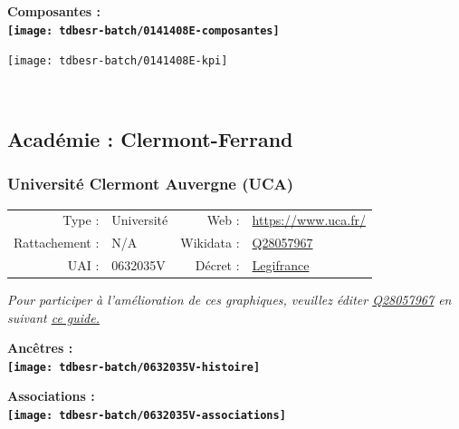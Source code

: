 \documentclass[12pt,french,]{article}
\begin{document}
\hrulefill

\begin{center} \bf Composantes : \\  
\texttt{[image: tdbesr-batch/0141408E-composantes]} \end{center}

\begin{center}\texttt{[image: tdbesr-batch/0141408E-kpi]} \end{center}\checkoddpage

\ifoddpage ~\newpage \fi   

\hypertarget{acaduxe9mie-clermont-ferrand}{%
\subsection{Académie :
Clermont-Ferrand}\label{acaduxe9mie-clermont-ferrand}}

\hypertarget{universituxe9-clermont-auvergne-uca}{%
\subsubsection{Université Clermont Auvergne
(UCA)}\label{universituxe9-clermont-auvergne-uca}}

\begin{tabular*}{\textwidth}{rp{5cm}rl}  
\hline  
Type : & Université & Web : &\href{https://www.uca.fr/}{https://www.uca.fr/} \\  
Rattachement : & N/A & Wikidata : & \href{https://www.wikidata.org/entity/Q28057967}{Q28057967} \\  
UAI : & 0632035V & Décret : & \href{https://www.legifrance.gouv.fr/affichTexte.do?cidTexte=JORFTEXT000033119145&categorieLien=id}{Legifrance} \\  
\hline  
\end{tabular*}

\textit{\scriptsize Pour participer à l'amélioration de ces graphiques, veuillez éditer  \href{https://www.wikidata.org/entity/Q28057967}{Q28057967}  en suivant \href{https://github.com/cpesr/wikidataESR/blob/master/Rmd/wikidataESR.md}{ce guide.}}

\vspace{1cm}  
\begin{minipage}[b]{0.50\textwidth}\begin{center} \bf Ancêtres : \\  
\texttt{[image: tdbesr-batch/0632035V-histoire]} \end{center}\end{minipage}\begin{minipage}[b]{0.50\textwidth}\begin{center} \bf Associations : \\  
\texttt{[image: tdbesr-batch/0632035V-associations]} \end{center}\end{minipage}
\end{document}
